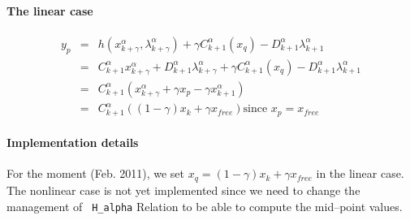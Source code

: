 \paragraph{The linear case}
\begin{equation}
  \begin{array}{lcl}
    y_p &=&  h(x^{\alpha}_{k+\gamma},\lambda^{\alpha}_{k+\gamma}) + \gamma C^{\alpha}_{k+1}(x_q) - D^{\alpha}_{k+1} \lambda^{\alpha}_{k+1}\\
        &=&  C^{\alpha}_{k+1} x^{\alpha}_{k+\gamma} + D^{\alpha}_{k+1}\lambda^{\alpha}_{k+\gamma}  + \gamma C^{\alpha}_{k+1}(x_q) - D^{\alpha}_{k+1} \lambda^{\alpha}_{k+1} \\
        &=& C^{\alpha}_{k+1}  (x^{\alpha}_{k+\gamma} + \gamma x_p - \gamma x^{\alpha}_{k+1} ) \\
        &=& C^{\alpha}_{k+1}  ((1-\gamma) x_{k} + \gamma x_{free} ) \text {since } x_p =x_{free} 
\end{array}
\end{equation}




\paragraph{Implementation details}

For the moment (Feb. 2011), we set $x_q=(1-\gamma) x_{k} + \gamma x_{free} $ in the linear case.
The nonlinear case is not yet implemented since we need to
change the management of \texttt{ H_alpha} Relation to be able to compute the mid--point values.
%








\clearpage


